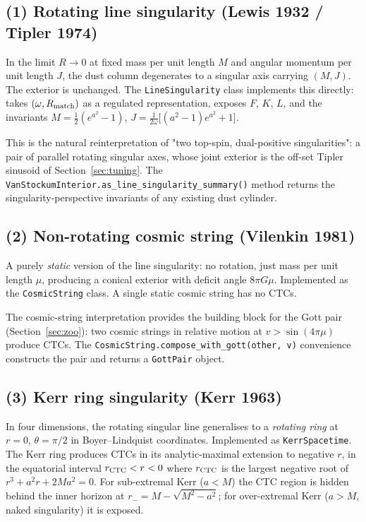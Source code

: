 \documentclass[11pt,a4paper]{article}
\begin{document}
\subsection{(1) Rotating line singularity (Lewis 1932 / Tipler 1974)}

In the limit $R \to 0$ at fixed mass per unit length $M$ and angular
momentum per unit length $J$, the dust column degenerates to a singular
axis carrying $(M, J)$. The exterior is unchanged. The
\texttt{LineSingularity} class implements this directly: takes
$(\omega, R_{\rm match})$ as a regulated representation, exposes
$F$, $K$, $L$, and the invariants $M = \tfrac{1}{2}(e^{a^2} - 1)$,
$J = \tfrac{1}{2\omega}\bigl[(a^2 - 1) e^{a^2} + 1\bigr]$.

This is the natural reinterpretation of "two top-spin, dual-positive
singularities": a pair of parallel rotating singular axes, whose joint
exterior is the off-set Tipler sinusoid of Section~\ref{sec:tuning}.
The \texttt{VanStockumInterior.as\_line\_singularity\_summary()}
method returns the singularity-perspective invariants of any
existing dust cylinder.

\subsection{(2) Non-rotating cosmic string (Vilenkin 1981)}

A purely \emph{static} version of the line singularity: no rotation,
just mass per unit length $\mu$, producing a conical exterior with
deficit angle $8\pi G\mu$. Implemented as the
\texttt{CosmicString} class. A single static cosmic string has no CTCs.

The cosmic-string interpretation provides the building block for the
Gott pair (Section~\ref{sec:zoo}): two cosmic strings in relative
motion at $v > \sin(4\pi\mu)$ produce CTCs. The
\texttt{CosmicString.compose\_with\_gott(other, v)} convenience
constructs the pair and returns a \texttt{GottPair} object.

\subsection{(3) Kerr ring singularity (Kerr 1963)}

In four dimensions, the rotating singular line generalises to a
\emph{rotating ring} at $r = 0$, $\theta = \pi/2$ in Boyer--Lindquist
coordinates. Implemented as \texttt{KerrSpacetime}. The Kerr ring
produces CTCs in its analytic-maximal extension to negative $r$, in
the equatorial interval $r_{\rm CTC} < r < 0$ where $r_{\rm CTC}$ is
the largest negative root of $r^3 + a^2 r + 2 M a^2 = 0$. For
sub-extremal Kerr ($a < M$) the CTC region is hidden behind the inner
horizon at $r_- = M - \sqrt{M^2 - a^2}$; for over-extremal Kerr
($a > M$, naked singularity) it is exposed.
\end{document}
